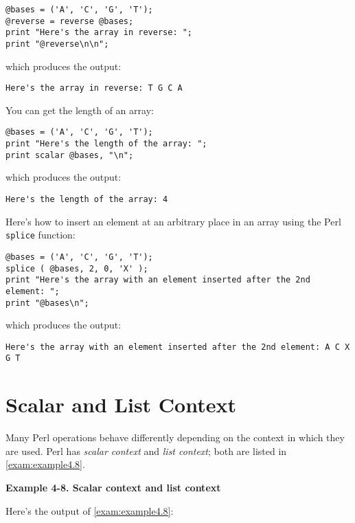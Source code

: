 \begin{lstlisting}
@bases = ('A', 'C', 'G', 'T');
@reverse = reverse @bases;
print "Here's the array in reverse: ";
print "@reverse\n\n";
\end{lstlisting}

which produces the output:

\begin{lstlisting}
Here's the array in reverse: T G C A
\end{lstlisting}

You can get the length of an array:

\begin{lstlisting}
@bases = ('A', 'C', 'G', 'T');
print "Here's the length of the array: ";
print scalar @bases, "\n";
\end{lstlisting}

which produces the output:

\begin{lstlisting}
Here's the length of the array: 4
\end{lstlisting}

Here's how to insert an element at an arbitrary place in an array using the Perl \verb|splice| function: 

\begin{lstlisting}
@bases = ('A', 'C', 'G', 'T');
splice ( @bases, 2, 0, 'X' );
print "Here's the array with an element inserted after the 2nd element: ";
print "@bases\n";
\end{lstlisting}

which produces the output:

\begin{lstlisting}
Here's the array with an element inserted after the 2nd element: A C X G T
\end{lstlisting}

\section{Scalar and List Context}
Many Perl operations behave differently depending on the context in which they are used. Perl has \textit{scalar context} and \textit{list context}; both are listed in \autoref{exam:example4.8}.

\textbf{Example 4-8. Scalar context and list context}



Here's the output of \autoref{exam:example4.8}:

